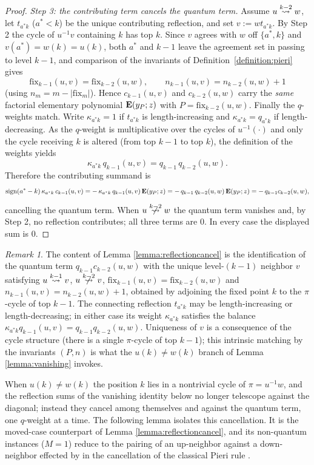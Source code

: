 \documentclass{amsart}
\theoremstyle{definition}
\theoremstyle{remark}
\newtheorem{remark}[lemma]{Remark}
\numberwithin{equation}{section}
\newcommand{\xrightsquigarrow}[2][]{%
	\mathrel{\mathop{\rightsquigarrow}\limits^{\scriptstyle #2}%
	\ifx\hfuzz#1\hfuzz\else_{\scriptstyle #1}\fi}%
}
\newcommand{\tom}[1]{\ensuremath{\xrightsquigarrow{#1}}}
\newcommand{\fx}{\mathrm{fix}}
\begin{document}
\begin{proof}
\emph{Step 3: the contributing term cancels the quantum term.} Assume $u\tom{k-2}w$, let $t_{a^\ast k}$ ($a^\ast<k$) be the unique contributing reflection, and set $v:=wt_{a^\ast k}$. By Step 2 the cycle of $u^{-1}v$ containing $k$ has top $k$. Since $v$ agrees with $w$ off $\{a^\ast,k\}$ and $v(a^\ast)=w(k)=u(k)$, both $a^\ast$ and $k-1$ leave the agreement set in passing to level $k-1$, and comparison of the invariants of Definition~\ref{definition:pieri} gives
$$\fx_{{k-1}}(u,v)=\fx_{{k-2}}(u,w),\qquad n_{k-1}(u,v)=n_{k-2}(u,w)+1$$
(using $n_m=m-|\fx_{m}|$). Hence $c_{k-1}(u,v)$ and $c_{k-2}(u,w)$ carry the \emph{same} factorial elementary polynomial $\mathbf{E}(y_P;z)$ with $P=\fx_{{k-2}}(u,w)$. Finally the $q$-weights match. Write $\kappa_{a^\ast k}=1$ if $t_{a^\ast k}$ is length-increasing and $\kappa_{a^\ast k}=q_{a^\ast k}$ if length-decreasing. As the $q$-weight is multiplicative over the cycles of $u^{-1}(\cdot)$ and only the cycle receiving $k$ is altered (from top $k-1$ to top $k$), the definition of the weights yields
$$\kappa_{a^\ast k}\,q_{k-1}(u,v)=q_{k-1}\,q_{k-2}(u,w).$$
Therefore the contributing summand is
$$\mathrm{sign}(a^\ast-k)\,\kappa_{a^\ast k}\,c_{k-1}(u,v)=-\,\kappa_{a^\ast k}\,q_{k-1}(u,v)\,\mathbf{E}(y_P;z)=-\,q_{k-1}\,q_{k-2}(u,w)\,\mathbf{E}(y_P;z)=-\,q_{k-1}c_{k-2}(u,w),$$
cancelling the quantum term. When $u\ntom{k-2}w$ the quantum term vanishes and, by Step 2, no reflection contributes; all three terms are $0$. In every case the displayed sum is $0$.
\end{proof}

\begin{remark} \label{remark:reflectionverify}
The content of Lemma \ref{lemma:reflectioncancel} is the identification of the quantum term $q_{k-1}c_{k-2}(u,w)$ with the unique level-$(k-1)$ neighbor $v$ satisfying $u\tom{k-1}v$, $u\ntom{k-2}v$, $\fx_{{k-1}}(u,v)=\fx_{{k-2}}(u,w)$ and $n_{k-1}(u,v)=n_{k-2}(u,w)+1$, obtained by adjoining the fixed point $k$ to the $\pi$-cycle of top $k-1$. The connecting reflection $t_{a^\ast k}$ may be length-increasing or length-decreasing; in either case its weight $\kappa_{a^\ast k}$ satisfies the balance $\kappa_{a^\ast k}q_{k-1}(u,v)=q_{k-1}q_{k-2}(u,w)$. Uniqueness of $v$ is a consequence of the cycle structure (there is a single $\pi$-cycle of top $k-1$); this intrinsic matching by the invariants $(P,n)$ is what the $u(k)\neq w(k)$ branch of Lemma \ref{lemma:vanishing} invokes.
\end{remark}

When $u(k)\neq w(k)$ the position $k$ lies in a nontrivial cycle of $\pi=u^{-1}w$, and the reflection sums of the vanishing identity below no longer telescope against the diagonal; instead they cancel among themselves and against the quantum term, one $q$-weight at a time. The following lemma isolates this cancellation. It is the moved-case counterpart of Lemma \ref{lemma:reflectioncancel}, and its non-quantum instances ($M=1$) reduce to the pairing of an up-neighbor against a down-neighbor effected by \cite[Lemma~7.9]{samuelmolev} in the cancellation of the classical Pieri rule \cite[Proof of Proposition~4.4]{samuelmolev}.
\end{document}
